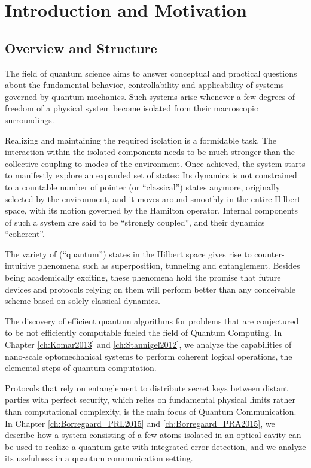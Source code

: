 \chapter{Introduction and Motivation}

\section{Overview and Structure}
The field of quantum science aims to answer conceptual and practical questions
about the fundamental behavior, controllability and applicability of 
systems governed by quantum mechanics. Such systems arise whenever a few 
degrees of freedom of a physical system become isolated from their macroscopic
surroundings. 

Realizing and maintaining the required isolation is a formidable
task. The interaction within the isolated components needs to be
much stronger than the collective coupling to modes of the environment.
Once achieved, the system starts to manifestly explore an expanded set of states: Its
dynamics is not constrained to a countable number of pointer (or
``classical'') states anymore, originally selected by the environment, and it
moves around smoothly in the entire Hilbert space, with its motion governed by the
Hamilton operator. Internal components of such a system are said to be ``strongly
coupled'', and their dynamics ``coherent''.

The variety of (``quantum'') states in the Hilbert space  gives rise
to counter-intuitive phenomena such as superposition, tunneling and
entanglement.
Besides being academically exciting, these phenomena hold the promise that
future devices and protocols relying on them will perform better than any
conceivable scheme based on solely classical dynamics. 

The discovery of
efficient quantum algorithms for problems that are conjectured to be not
efficiently computable fueled the field of Quantum Computing. In Chapter
\ref{ch:Komar2013} and \ref{ch:Stannigel2012}, we analyze the
capabilities of nano-scale optomechanical systems to perform coherent logical
operations, the elemental steps of quantum computation.

Protocols that
rely on entanglement to distribute secret keys between distant parties with
perfect security, which relies on fundamental physical limits rather than
computational complexity, is the main focus of Quantum Communication. In Chapter
\ref{ch:Borregaard_PRL2015} and \ref{ch:Borregaard_PRA2015}, we describe how a system consisting of a few atoms
isolated in an optical cavity can be used to realize a quantum gate with
integrated error-detection, and we analyze its usefulness in a quantum
communication setting.

